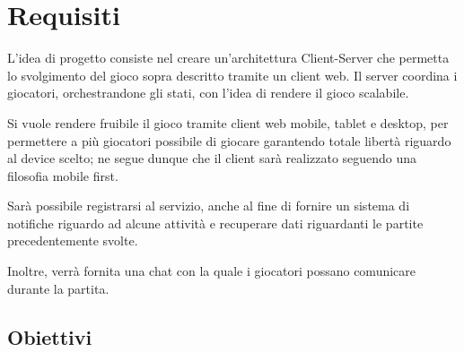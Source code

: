 \chapter{Requisiti}
L’idea di progetto consiste nel creare un’architettura Client-Server che permetta lo svolgimento del gioco sopra descritto tramite un client web.\newline
\noindent Il server coordina i giocatori, orchestrandone gli stati, con l’idea di rendere il gioco scalabile.\newline

\noindent Si vuole rendere fruibile il gioco tramite client web mobile, tablet e desktop, per permettere a più giocatori possibile di giocare garantendo totale libertà riguardo al device scelto; ne segue dunque che il client sarà realizzato seguendo una filosofia mobile first.\newline

\noindent Sarà possibile registrarsi al servizio, anche al fine di fornire un sistema di notifiche riguardo ad alcune attività e recuperare dati riguardanti le partite precedentemente svolte.\newline

\noindent Inoltre, verrà fornita una chat con la quale i giocatori possano comunicare durante la partita.\newline

\section{Obiettivi}

